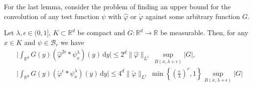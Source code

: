For the last lemma, consider the problem of finding an upper bound for the convolution of any test function \(\psi\) with \(\hat \varphi\) or \(\check \varphi\) against some arbitrary function \(G\).   

\begin{lemma}\label{lemma:WALFANGER}
    Let \(\lambda, \epsilon \in (0,1]\), \(K \subset \mathbb{R}^d\) be compact and \(G: \mathbb{R}^d \to \mathbb{R}\) be measurable. Then, for any \(x \in K\) and \(\psi \in \mathcal{B}_r\) we have 
    \begin{align} 
        &\Big| \int_{\mathbb{R}^d} G(y) \left( \hat \varphi^{2\epsilon} * \psi^\lambda_x \right) (y) \, \mathrm{d}y \Big| \leq 2^d \lVert \hat \varphi \rVert_{L^1} \, \sup_{B(x, \lambda + \epsilon)}|G|, \\
        &\Big| \int_{\mathbb{R}^d} G(y) \left( \check \varphi^{\epsilon} * \psi^\lambda_x \right) (y) \, \mathrm{d}y \Big| \leq 4^d \lVert \check \varphi \rVert_{L^1} \, \min\left\{ \left(\frac{\epsilon}{\lambda}\right)^r, 1 \right\}  \sup_{B(x, \lambda + \epsilon)}|G| \label{eq:WALFANGER}
    \end{align}  
\end{lemma}

